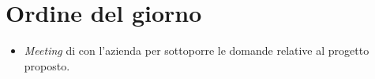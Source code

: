 \section{Ordine del giorno}
\begin{itemize}
    \item \textit{Meeting} di con l'azienda per sottoporre le domande relative al progetto proposto.
\end{itemize}
